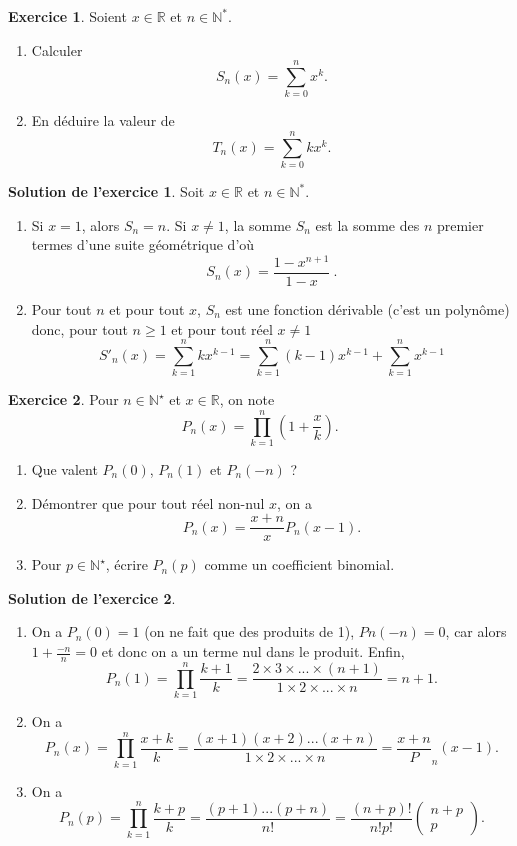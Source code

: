 \documentclass[a4paper, 11pt,openany]{article}%
\theoremstyle{plain}
\theoremstyle{definition}
\newtheorem{exo}{Exercice}
\newtheorem{sol}{Solution de l'exercice}
\theoremstyle{remark}
\newcommand{\R}{\mathbb{R}}
\newcommand{\N}{\mathbb{N}}
\begin{document}
\begin{exo}
	Soient $x\in \R$ et $n\in \N^*$.
	\begin{enumerate}
		\item Calculer \[ S_n(x) = \sum_{k=0}^n x^k.\]
		\item En déduire la valeur de $$T_n(x) = \sum_{k=0}^n kx^k.$$
	\end{enumerate}
\end{exo}
%
\begin{sol}
	Soit $x\in \R$ et $n\in \N^*$.
	\begin{enumerate}
		\item Si $x=1$, alors $S_n = n$. Si $x\ne 1$, la somme $S_n$ est la somme des $n$ premier termes d'une suite géométrique d'où 
		\[
			S_n(x) = \frac{1-x^{n+1}}{1-x} \ .
		\]
		\item Pour tout $n$ et pour tout $x$, $S_n$ est une fonction dérivable (c'est un polynôme) donc, pour tout $n\geqslant 1$ et pour tout réel $x\ne 1$
		\[
			S'_n(x) = \sum_{k=1}^n kx^{k-1} = \sum_{k=1}^n (k-1)x^{k-1} + \sum_{k=1}^n x^{k-1}
		\]
	\end{enumerate}
\end{sol}
   
\begin{exo}
Pour $n \in \N^{\star}$ et $x \in \R$, on note $$P_n(x)= \prod_{k=1}^n \left(1+ \frac{x}{k} \right).$$
\begin{enumerate}
\item Que valent $P_n(0)$, $P_n(1)$ et $P_n(-n)$ ?
\item Démontrer que pour tout réel non-nul $x$, on a $$P_n(x)= \frac{x+n}{x} P_n(x-1).$$
\item Pour $p \in \N^{\star}$, écrire $P_n(p)$ comme un coefficient binomial.
\end{enumerate}
\end{exo}

\begin{sol}
	\begin{enumerate}
		\item On a $P_n(0)=1$ (on ne fait que des produits de 1), $Pn(-n)=0$, car alors $1+\frac{-n}{n}=0$ et donc on a un terme nul dans le produit. Enfin, 
		\[ P_n(1)= \prod_{k=1}^n  \frac{k+1}{k} = \frac{2 \times 3 \times ... \times (n+1)}{1 \times 2 \times ... \times n} = n+1.\]
		\item On a 
		$$P_n(x)= \prod_{k=1}^n \frac{x+k}{k} = \frac{(x+1) (x+2) ... (x+n)}{1 \times 2 \times ... \times n } = \frac{x+n} P_n(x-1).$$
				\item On a 
		$$P_n(p)= \prod_{k=1}^n \frac{k+p}{k} = \frac{(p+1) ... (p+n)}{n!} = \frac{(n+p)!}{n! p!} \begin{pmatrix} n+p \\ p \end{pmatrix}.$$
	\end{enumerate}
\end{sol}
\end{document}
